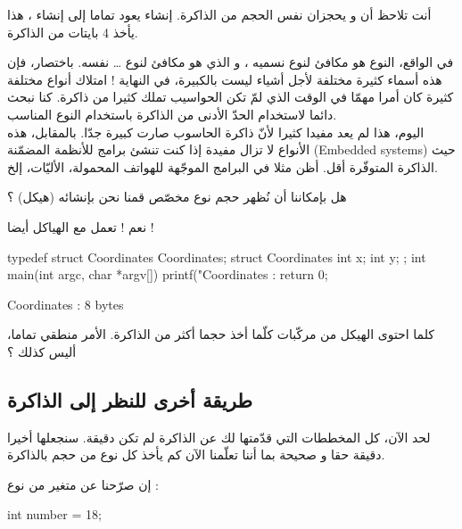 أنت تلاحظ أن
و
يحجزان نفس الحجم من الذاكرة. إنشاء
يعود تماما إلى إنشاء
،
هذا يأخذ 4 بايتات من الذاكرة.

\begin{information}
في الواقع، النوع
هو مكافئ لنوع نسميه
،
و الذي هو مكافئ لنوع \dots
{}
نفسه. باختصار، فإن هذه أسماء كثيرة مختلفة لأجل أشياء ليست بالكبيرة، في النهاية ! امتلاك أنواع مختلفة كثيرة كان أمرا مهمّا  في الوقت الذي لمّ تكن الحواسيب تملك كثيرا من ذاكرة. كنا نبحث دائما لاستخدام الحدّ الأدنى من الذاكرة باستخدام النوع المناسب.\\
اليوم، هذا لم يعد مفيدا كثيرا لأنّ ذاكرة الحاسوب صارت كبيرة جدّا. بالمقابل، هذه الأنواع لا تزال مفيدة إذا كنت تنشئ برامج للأنظمة المضمّنة
(\textenglish{Embedded systems})
حيث الذاكرة المتوفّرة أقل. أظن مثلا في البرامج الموجّهة للهواتف المحمولة، الأليّات، إلخ.
\end{information}

\begin{question}
هل بإمكاننا أن نُظهر حجم نوع مخصّص قمنا نحن بإنشائه (هيكل) ؟
\end{question}

نعم !
تعمل مع الهياكل أيضا !

\begin{Csource}
typedef struct Coordinates Coordinates;
struct Coordinates
{
	int x;
	int y;
};
int main(int argc, char *argv[])
{
	printf("Coordinates  : %
	return 0;
}
\end{Csource}

\begin{Console}
Coordinates : 8 bytes
\end{Console}

كلما احتوى الهيكل من مركّبات كلّما أخذ حجما أكثر من الذاكرة. الأمر منطقي تماما، أليس كذلك ؟

\subsection{طريقة أخرى للنظر إلى الذاكرة}

لحد الآن، كل المخططات التي قدّمتها لك عن الذاكرة لم تكن دقيقة. سنجعلها أخيرا دقيقة حقا و صحيحة بما أننا تعلّمنا الآن كم يأخذ كل نوع من حجم بالذاكرة.

إن صرّحنا عن متغير من نوع
 :

\begin{Csource}
int number = 18;
\end{Csource}

